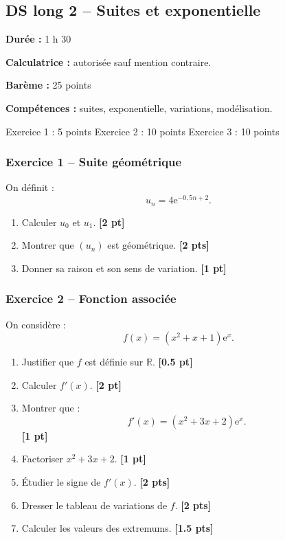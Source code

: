 \documentclass[11pt,a4paper]{article}
\newcommand{\R}{\mathbb{R}}
\newcommand{\e}{\mathrm{e}}
\newcommand{\pts}[1]{\hfill \textbf{[#1 pt]}}
\newcommand{\ptss}[1]{\hfill \textbf{[#1 pts]}}
\newcommand{\competences}[1]{\textbf{Compétences :} #1}
\newcommand{\calculatrice}{\textbf{Calculatrice :} autorisée sauf mention contraire.}
\newcommand{\duree}[1]{\textbf{Durée :} #1}
\newcommand{\bareme}[1]{\textbf{Barème :} #1}
\begin{document}
\newpage

\subsection*{DS long 2 -- Suites et exponentielle}

\begin{sujetbox}
\duree{1 h 30}

\calculatrice

\bareme{25 points}

\competences{suites, exponentielle, variations, modélisation.}
\end{sujetbox}

\begin{baremebox}
Exercice 1 : 5 points \quad
Exercice 2 : 10 points \quad
Exercice 3 : 10 points
\end{baremebox}

\subsubsection*{Exercice 1 -- Suite géométrique}

On définit :
\[
u_n=4\e^{-0,5n+2}.
\]
\begin{enumerate}
    \item Calculer $u_0$ et $u_1$. \pts{2}
    \item Montrer que $(u_n)$ est géométrique. \ptss{2}
    \item Donner sa raison et son sens de variation. \pts{1}
\end{enumerate}

\subsubsection*{Exercice 2 -- Fonction associée}

On considère :
\[
f(x)=(x^2+x+1)\e^x.
\]
\begin{enumerate}
    \item Justifier que $f$ est définie sur $\R$. \pts{0.5}
    \item Calculer $f'(x)$. \pts{2}
    \item Montrer que :
    \[
    f'(x)=(x^2+3x+2)\e^x.
    \]
    \pts{1}
    \item Factoriser $x^2+3x+2$. \pts{1}
    \item Étudier le signe de $f'(x)$. \ptss{2}
    \item Dresser le tableau de variations de $f$. \ptss{2}
    \item Calculer les valeurs des extremums. \ptss{1.5}
\end{enumerate}
\end{document}
